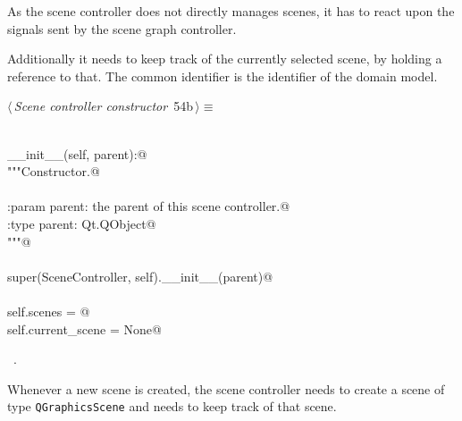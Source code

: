 \documentclass[
    a4paper,      %
    10pt,         %
    openright,    %
    notitlepage,  %
    parskip=half, %
]{scrreprt}       %
\theoremstyle{definition}                    %
\begin{document}
As the scene controller does not directly manages scenes, it has to react upon
the signals sent by the scene graph controller.

Additionally it needs to keep track of the currently selected scene, by holding
a reference to that. The common identifier is the identifier of the domain
model.

\begin{flushleft} \small
\begin{minipage}{\linewidth}\label{scrap83}\raggedright\small
{} $\langle\,${\itshape Scene controller constructor}\nobreak\ {\footnotesize {54b}}$\,\rangle\equiv$
\vspace{-1exm}
\begin{list}{}{} \item
\mbox{}\lstinline@@\\
\mbox{}\lstinline@def __init__(self, parent):@\\
\mbox{}\lstinline@    """Constructor.@\\
\mbox{}\lstinline@@\\
\mbox{}\lstinline@    :param parent: the parent of this scene controller.@\\
\mbox{}\lstinline@    :type parent: Qt.QObject@\\
\mbox{}\lstinline@    """@\\
\mbox{}\lstinline@@\\
\mbox{}\lstinline@    super(SceneController, self).__init__(parent)@\\
\mbox{}\lstinline@@\\
\mbox{}\lstinline@    self.scenes = {}@\\
\mbox{}\lstinline@    self.current_scene = None@\\
\mbox{}\lstinline@@{\NWsep}
\end{list}
\vspace{-1.5ex}
\footnotesize
\begin{list}{}{\setlength{\itemsep}{-\parsep}\setlength{\itemindent}{-\leftmargin}}
\item \NWtxtMacroRefIn\ .

\item{}
\end{list}
\end{minipage}\vspace{4ex}
\end{flushleft}
Whenever a new scene is created, the scene controller needs to create a scene of
type \verb+QGraphicsScene+ and needs to keep track of that scene.
\end{document}
